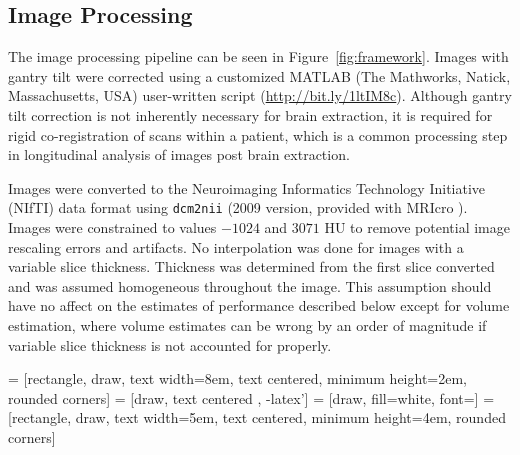 \documentclass{elsarticle}\usepackage[]{graphicx}\usepackage[]{color}
\begin{document}
\subsection{Image Processing}
The image processing pipeline can be seen in Figure~\ref{fig:framework}.
Images with gantry tilt were corrected using a customized MATLAB (The Mathworks, Natick, Massachusetts, USA) user-written script (\url{http://bit.ly/1ltIM8c}).  Although gantry tilt correction is not inherently necessary for brain extraction, it is required for rigid co-registration of scans within a patient, which is a common processing step in longitudinal analysis of images post brain extraction. 

Images were converted to the Neuroimaging Informatics Technology Initiative (NIfTI) data format using \texttt{dcm2nii} (2009 version, provided with MRIcro \citep{rorden_stereotaxic_2000}).  Images were constrained to values $-1024$ and $3071$ HU to remove potential image rescaling errors and artifacts.  No interpolation was done for images with a variable slice thickness. Thickness was determined from the first slice converted and was assumed homogeneous throughout the image.  This assumption should have no affect on the estimates of performance described below except for volume estimation, where volume estimates can be wrong by an order of magnitude if variable slice thickness is not accounted for properly.


 = [rectangle, draw, text width=8em, text centered, minimum height=2em, rounded corners]
 = [draw, text centered , -latex']
 = [draw, fill=white, font=\tiny ]
 = [rectangle, draw, text width=5em, text centered, minimum height=4em, rounded corners]    
\end{document}
